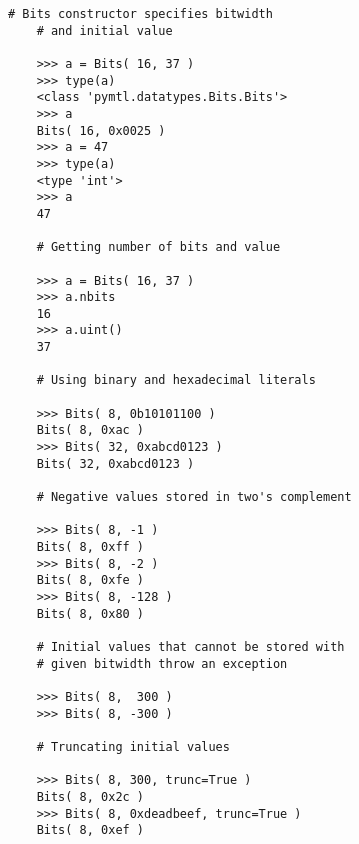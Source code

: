 

  \begin{lstlisting}[gobble=4]
    # Bits constructor specifies bitwidth
    # and initial value

    >>> a = Bits( 16, 37 )
    >>> type(a)
    <class 'pymtl.datatypes.Bits.Bits'>
    >>> a
    Bits( 16, 0x0025 )
    >>> a = 47
    >>> type(a)
    <type 'int'>
    >>> a
    47

    # Getting number of bits and value

    >>> a = Bits( 16, 37 )
    >>> a.nbits
    16
    >>> a.uint()
    37

    # Using binary and hexadecimal literals

    >>> Bits( 8, 0b10101100 )
    Bits( 8, 0xac )
    >>> Bits( 32, 0xabcd0123 )
    Bits( 32, 0xabcd0123 )

    # Negative values stored in two's complement

    >>> Bits( 8, -1 )
    Bits( 8, 0xff )
    >>> Bits( 8, -2 )
    Bits( 8, 0xfe )
    >>> Bits( 8, -128 )
    Bits( 8, 0x80 )

    # Initial values that cannot be stored with
    # given bitwidth throw an exception

    >>> Bits( 8,  300 )
    >>> Bits( 8, -300 )

    # Truncating initial values

    >>> Bits( 8, 300, trunc=True )
    Bits( 8, 0x2c )
    >>> Bits( 8, 0xdeadbeef, trunc=True )
    Bits( 8, 0xef )
\end{lstlisting}

  \label{code-tut3-basics-bits1}

